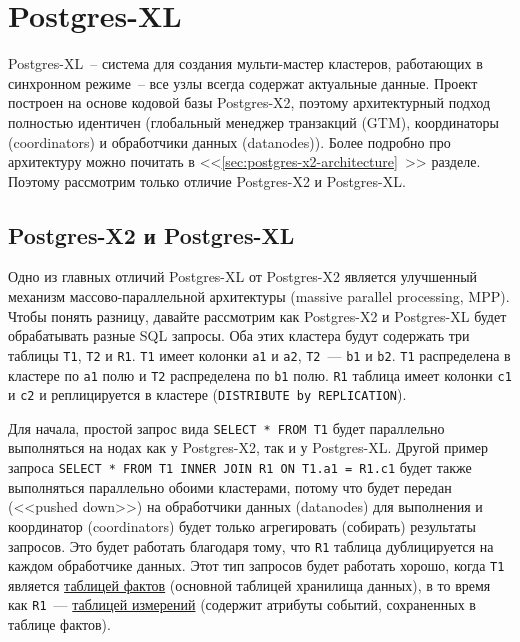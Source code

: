 \section{Postgres-XL}
\label{sec:postgres-xl}

Postgres-XL~-- система для создания мульти-мастер кластеров, работающих в синхронном режиме~-- все узлы всегда содержат актуальные данные. Проект построен на основе кодовой базы Postgres-X2, поэтому архитектурный подход полностью идентичен (глобальный менеджер транзакций (GTM), координаторы (coordinators) и обработчики данных (datanodes)). Более подробно про архитектуру можно почитать в <<\ref{sec:postgres-x2-architecture}~>> разделе. Поэтому рассмотрим только отличие Postgres-X2 и Postgres-XL.


\subsection{Postgres-X2 и Postgres-XL}

Одно из главных отличий Postgres-XL от Postgres-X2 является улучшенный механизм массово-параллельной архитектуры (massive parallel processing, MPP). Чтобы понять разницу, давайте рассмотрим как Postgres-X2 и Postgres-XL будет обрабатывать разные SQL запросы. Оба этих кластера будут содержать три таблицы \lstinline!T1!, \lstinline!T2! и \lstinline!R1!. \lstinline!T1! имеет колонки \lstinline!a1! и \lstinline!a2!, \lstinline!T2!~--- \lstinline!b1! и \lstinline!b2!. \lstinline!T1! распределена в кластере по \lstinline!a1! полю и \lstinline!T2! распределена по \lstinline!b1! полю. \lstinline!R1! таблица имеет колонки \lstinline!c1! и \lstinline!c2! и реплицируется в кластере (\lstinline!DISTRIBUTE by REPLICATION!).

Для начала, простой запрос вида \lstinline!SELECT * FROM T1! будет параллельно выполняться на нодах как у Postgres-X2, так и у Postgres-XL. Другой пример запроса \lstinline!SELECT * FROM T1 INNER JOIN R1 ON T1.a1 = R1.c1! будет также выполняться параллельно обоими кластерами, потому что будет передан (<<pushed down>>) на обработчики данных (datanodes) для выполнения и координатор (coordinators) будет только агрегировать (собирать) результаты запросов. Это будет работать благодаря тому, что \lstinline!R1! таблица дублицируется на каждом обработчике данных. Этот тип запросов будет работать хорошо, когда \lstinline!T1! является \href{https://en.wikipedia.org/wiki/Fact\_table}{таблицей фактов} (основной таблицей хранилища данных), в то время как \lstinline!R1!~--- \href{https://en.wikipedia.org/wiki/Dimension\_(data\_warehouse)#Dimension\_table}{таблицей измерений} (содержит атрибуты событий, сохраненных в таблице фактов).


